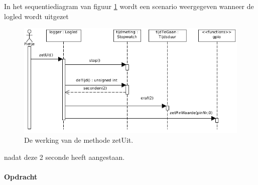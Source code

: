 \begin{itemize}
 In het sequentiediagram van figuur \ref{fig:ll_zetUit} wordt een scenario weergegeven wanneer de logled wordt uitgezet
  \begin{figure}[h!]
	\captionsetup{justification=centering}
	\includegraphics[width=0.8 \linewidth]{figuren/seqZetUit}      %
\centering
\caption{De werking van de methode zetUit.}
\label{fig:ll_zetUit}
\end{figure} 
nadat deze 2 seconde heeft aangestaan.
\end{itemize}
\newpage
\paragraph{Opdracht}

